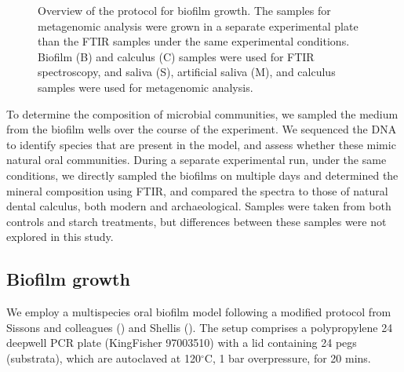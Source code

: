 \documentclass[
  b5paper,
]{book}
\begin{document}
\begin{figure}


\caption{\label{fig-met-protocol}Overview of the protocol for biofilm
growth. The samples for metagenomic analysis were grown in a separate
experimental plate than the FTIR samples under the same experimental
conditions. Biofilm (B) and calculus (C) samples were used for FTIR
spectroscopy, and saliva (S), artificial saliva (M), and calculus
samples were used for metagenomic analysis.}

\end{figure}%

To determine the composition of microbial communities, we sampled the
medium from the biofilm wells over the course of the experiment. We
sequenced the DNA to identify species that are present in the model, and
assess whether these mimic natural oral communities. During a separate
experimental run, under the same conditions, we directly sampled the
biofilms on multiple days and determined the mineral composition using
FTIR, and compared the spectra to those of natural dental calculus, both
modern and archaeological. Samples were taken from both controls and
starch treatments, but differences between these samples were not
explored in this study.

\subsection{Biofilm growth}\label{biofilm-growth}

We employ a multispecies oral biofilm model following a modified
protocol from Sissons and colleagues
() and Shellis
(). The setup comprises a
polypropylene 24 deepwell PCR plate (KingFisher 97003510) with a lid
containing 24 pegs (substrata), which are autoclaved at
120\(^{\circ}\)C, 1 bar overpressure, for 20 mins.
\end{document}

